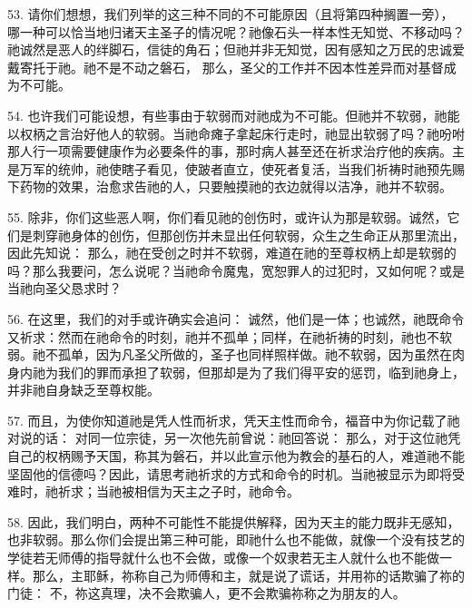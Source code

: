 53. 请你们想想，我们列举的这三种不同的不可能原因（且将第四种搁置一旁），哪一种可以恰当地归诸天主圣子的情况呢？祂像石头一样本性无知觉、不移动吗？祂诚然是恶人的绊脚石，信徒的角石；但祂并非无知觉，因有感知之万民的忠诚爱戴寄托于祂。祂不是不动之磐石，  那么，圣父的工作并不因本性差异而对基督成为不可能。\par

54. 也许我们可能设想，有些事由于软弱而对祂成为不可能。但祂并不软弱，祂能以权柄之言治好他人的软弱。当祂命瘫子拿起床行走时，祂显出软弱了吗？祂吩咐那人行一项需要健康作为必要条件的事，那时病人甚至还在祈求治疗他的疾病。主是万军的统帅，祂使瞎子看见，使跛者直立，使死者复活，当我们祈祷时祂预先赐下药物的效果，治愈求告祂的人，只要触摸祂的衣边就得以洁净，祂并不软弱。\par

55. 除非，你们这些恶人啊，你们看见祂的创伤时，或许认为那是软弱。诚然，它们是刺穿祂身体的创伤，但那创伤并未显出任何软弱，众生之生命正从那里流出，因此先知说：  那么，祂在受创之时并不软弱，难道在祂的至尊权柄上却是软弱的吗？那么我要问，怎么说呢？当祂命令魔鬼，宽恕罪人的过犯时，又如何呢？或是当祂向圣父恳求时？\par

56. 在这里，我们的对手或许确实会追问： 诚然，他们是一体；也诚然，祂既命令又祈求：然而在祂命令的时刻，祂并不孤单；同样，在祂祈祷的时刻，祂也不软弱。祂不孤单，因为凡圣父所做的，圣子也同样照样做。祂不软弱，因为虽然在肉身内祂为我们的罪而承担了软弱，但那却是为了我们得平安的惩罚，临到祂身上，并非祂自身缺乏至尊权能。\par

57. 而且，为使你知道祂是凭人性而祈求，凭天主性而命令，福音中为你记载了祂对说的话： 对同一位宗徒，另一次他先前曾说：祂回答说： 那么，对于这位祂凭自己的权柄赐予天国，称其为磐石，并以此宣示他为教会的基石的人，难道祂不能坚固他的信德吗？因此，请思考祂祈求的方式和命令的时机。当祂被显示为即将受难时，祂祈求；当祂被相信为天主之子时，祂命令。\par

58. 因此，我们明白，两种不可能性不能提供解释，因为天主的能力既非无感知，也非软弱。那么你们会提出第三种可能，即祂什么也不能做，就像一个没有技艺的学徒若无师傅的指导就什么也不会做，或像一个奴隶若无主人就什么也不能做一样。那么，主耶稣，祢称自己为师傅和主，就是说了谎话，并用祢的话欺骗了祢的门徒： 不，祢这真理，决不会欺骗人，更不会欺骗祢称之为朋友的人。\par

